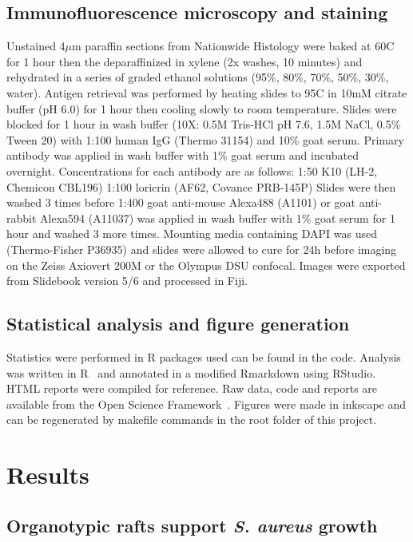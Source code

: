 \documentclass[10pt,letterpaper]{article}
\begin{document}
\subsection*{Immunofluorescence microscopy and staining}
Unstained 4$\mu$m paraffin sections from Nationwide Histology were baked at 60\degree C for 1 hour then the deparaffinized in xylene (2x washes, 10 minutes) and rehydrated in a series of graded ethanol solutions (95\%, 80\%, 70\%, 50\%, 30\%, water).
Antigen retrieval was performed by heating slides to 95\degree C in 10mM citrate buffer (pH 6.0) for 1 hour then cooling slowly to room temperature.
Slides were blocked for 1 hour in wash buffer (10X: 0.5M Tris-HCl pH 7.6, 1.5M NaCl, 0.5\% Tween 20) with 1:100 human IgG (Thermo 31154) and 10\% goat serum.
Primary antibody was applied in wash buffer with 1\% goat serum and incubated overnight.
Concentrations for each antibody are as follows:
1:50 K10 (LH-2, Chemicon CBL196)
1:100 loricrin (AF62, Covance PRB-145P)
Slides were then washed 3 times before 1:400 goat anti-mouse Alexa488 (A1101) or goat anti-rabbit Alexa594 (A11037) was applied in wash buffer with 1\% goat serum for 1 hour and washed 3 more times.
Mounting media containing DAPI was used (Thermo-Fisher P36935) and slides were allowed to cure for 24h before imaging on the Zeiss Axiovert 200M or the Olympus DSU confocal.
Images were exported from Slidebook version 5/6 and processed in Fiji.

\subsection*{Statistical analysis and figure generation}
Statistics were performed in R packages used can be found in the code. Analysis was written in R~\cite{r_core_team_r:_2015} and annotated in a modified Rmarkdown using RStudio.
HTML reports were compiled for reference. Raw data, code and reports are available from the Open Science Framework~\cite{chan_organotypic_2016}.
Figures were made in inkscape and can be regenerated by makefile commands in the root folder of this project.

\section*{Results}


\subsection*{Organotypic rafts support \textit{S. aureus} growth}
\end{document}
